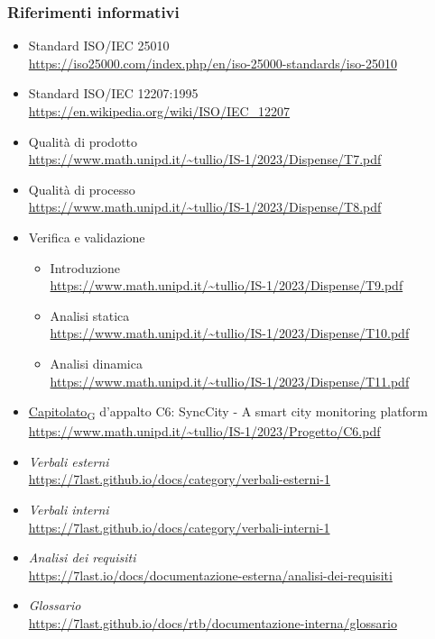 \subsubsection{Riferimenti informativi}
\begin{itemize}
    \item Standard ISO/IEC 25010 \\
        \url{https://iso25000.com/index.php/en/iso-25000-standards/iso-25010}
    \item Standard ISO/IEC 12207:1995 \\
        \url{https://en.wikipedia.org/wiki/ISO/IEC_12207}
    \item Qualità di prodotto \\
        \url{https://www.math.unipd.it/~tullio/IS-1/2023/Dispense/T7.pdf}
    \item Qualità di processo \\
        \url{https://www.math.unipd.it/~tullio/IS-1/2023/Dispense/T8.pdf}
    \item Verifica e validazione
        \begin{itemize}
            \item Introduzione \\
                \url{https://www.math.unipd.it/~tullio/IS-1/2023/Dispense/T9.pdf}
            \item Analisi statica \\
                \url{https://www.math.unipd.it/~tullio/IS-1/2023/Dispense/T10.pdf}
            \item Analisi dinamica \\
                \url{https://www.math.unipd.it/~tullio/IS-1/2023/Dispense/T11.pdf}
        \end{itemize}
    \item \href{https://7last.github.io/docs/rtb/documentazione-interna/glossario\#capitolato}{Capitolato\textsubscript{G}} d'appalto C6: SyncCity - A smart city monitoring platform\\
        \url{https://www.math.unipd.it/~tullio/IS-1/2023/Progetto/C6.pdf}
    \item \textit{Verbali esterni} \\
        \url{https://7last.github.io/docs/category/verbali-esterni-1}
    \item \textit{Verbali interni} \\
        \url{https://7last.github.io/docs/category/verbali-interni-1}
    \item \textit{Analisi dei requisiti} \\
        \url{https://7last.io/docs/documentazione-esterna/analisi-dei-requisiti}
    \item \textit{Glossario} \\
        \url{https://7last.github.io/docs/rtb/documentazione-interna/glossario}
\end{itemize}